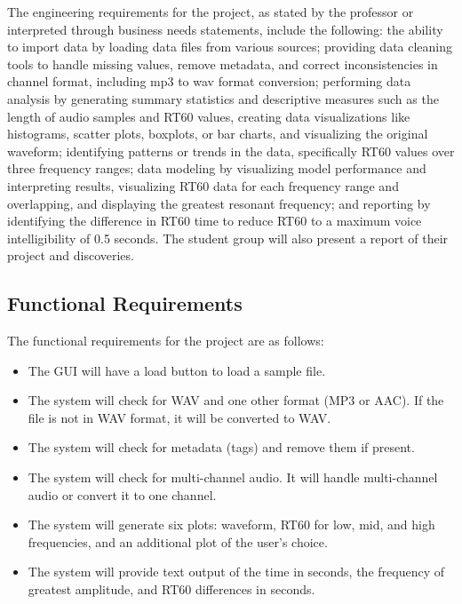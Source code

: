 \documentclass[11pt]{article}
\begin{document}
The engineering requirements for the project, as stated by the professor or interpreted 
through business needs statements, include the following: the ability to import data by 
loading data files from various sources; providing data cleaning tools to handle missing 
values, remove metadata, and correct inconsistencies in channel format, including 
mp3 to wav format conversion; performing data analysis by generating summary statistics 
and descriptive measures such as the length of audio samples and RT60 values, 
creating data visualizations like histograms, scatter plots, boxplots, or bar charts, 
and visualizing the original waveform; identifying patterns or trends in the data, 
specifically RT60 values over three frequency ranges; data modeling by visualizing model 
performance and interpreting results, visualizing RT60 data for each frequency range and overlapping, 
and displaying the greatest resonant frequency; and reporting by identifying the difference in 
RT60 time to reduce RT60 to a maximum voice intelligibility of 0.5 seconds. The student group will 
also present a report of their project and discoveries.

\subsection{Functional Requirements}

The functional requirements for the project are as follows:

\begin{itemize}
    \item The GUI will have a load button to load a sample file.
    \item The system will check for WAV and one other format (MP3 or AAC). If the file is not in WAV format, it will be converted to WAV.
    \item The system will check for metadata (tags) and remove them if present.
    \item The system will check for multi-channel audio. It will handle multi-channel audio or convert it to one channel.
    \item The system will generate six plots: waveform, RT60 for low, mid, and high frequencies, and an additional plot of the user's choice.
    \item The system will provide text output of the time in seconds, the frequency of greatest amplitude, and RT60 differences in seconds.
\end{itemize}
\end{document}
